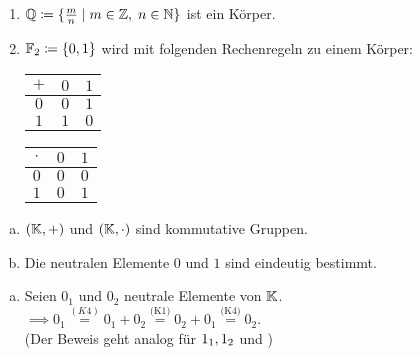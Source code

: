 \documentclass[../ana1.tex]{subfiles}
\begin{document}
\begin{bspe}\leavevmode
	\begin{enumerate}[(1)]
		\item \(\mathbb{Q} \coloneqq \{\frac{m}{n}  \; \vert  \; m \in \mathbb{Z} ,  \; n \in \mathbb{N}\} \) ist ein Körper.
		\item \(\mathbb{F}_{2} \coloneqq \{0 , 1\} \) wird mit folgenden Rechenregeln zu einem Körper:
			  \begin{center}
				\begin{tabular}{c|cc}
					\(+ \) & \(0 \) & \(1 \) \\
					\midrule
					\(0 \) & \(0 \) & \(1 \) \\
					\(1 \) & \(1 \) & \(0 \)
				\end{tabular}
				\qquad
				\begin{tabular}{c|cc}
					\(\cdot \) & \(0 \) & \(1 \) \\
					\midrule
					\(0 \)     & \(0 \) & \(0 \) \\
					\(1 \)     & \(0 \) & \(1 \)
				\end{tabular}
			   \end{center}
	\end{enumerate}
\end{bspe}

\iftoggle{short}{}{\newpage}%

\begin{bem}\leavevmode
	\begin{enumerate}[(a)]
		\item \((\mathbb{K} , +) \) und \((\mathbb{K} , \cdot) \) sind kommutative Gruppen.
		\item Die neutralen Elemente \(0 \) und \(1 \) sind eindeutig bestimmt.
	\end{enumerate}
\end{bem}
\begin{bew}\leavevmode
	\begin{enumerate}[(b)]
		\item Seien \(0_{1} \) und \(0_{2} \) neutrale Elemente von \(\mathbb{K} \). \\
			  \(\implies 0_{1} \overset{ \hyperref[ax:K4]{(K4)} }{=} 0_{1} + 0_{2} \overset{ \hyperref[ax:K1]{\text{(K1)}} }{=} 0_{2} + 0_{1} \overset{ \hyperref[ax:K4]{\text{(K4)}} }{=} 0_{2} \). \\
			  (Der Beweis geht analog für \(1_{1} , 1_{2} \) und \gqq{\(\cdot \)})\qedhere
	\end{enumerate}
\end{bew}
\end{document}
